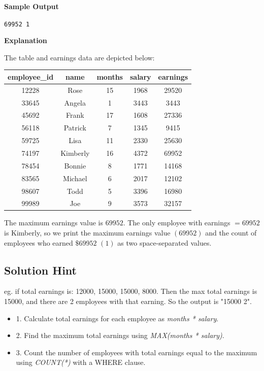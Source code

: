 \documentclass[12pt,a4paper]{article}
\renewcommand{\arraystretch}{1.5} %
\begin{document}
\textbf{Sample Output}
\begin{center}
\texttt{69952 1}
\end{center}

\textbf{Explanation}

The table and earnings data are depicted below:

\begin{table}[H]
\centering
\renewcommand{\arraystretch}{1.25}
\begin{tabular}{|c|c|c|c|c|}
\hline
\textbf{employee\_id} & \textbf{name} & \textbf{months} & \textbf{salary} & \textbf{earnings} \\ \hline
12228 & Rose     & 15 & 1968 & 29520 \\ \hline
33645 & Angela   & 1  & 3443 & 3443  \\ \hline
45692 & Frank    & 17 & 1608 & 27336 \\ \hline
56118 & Patrick  & 7  & 1345 & 9415  \\ \hline
59725 & Lisa     & 11 & 2330 & 25630 \\ \hline
74197 & Kimberly & 16 & 4372 & 69952 \\ \hline
78454 & Bonnie   & 8  & 1771 & 14168 \\ \hline
83565 & Michael  & 6  & 2017 & 12102 \\ \hline
98607 & Todd     & 5  & 3396 & 16980 \\ \hline
99989 & Joe      & 9  & 3573 & 32157 \\ \hline
\end{tabular}
\end{table}
The maximum earnings value is \(69952\). The only employee with earnings \(= 69952\) is Kimberly, so we print the maximum earnings value \((69952)\) and the count of employees who earned \(\$69952\) \((1)\) as two space-separated values.
\subsection*{Solution Hint}
eg. if total earnings is: 12000, 15000, 15000, 8000.
Then the max total earnings is 15000, and there are 2 employees with that earning. So the output is "15000 2".
\begin{itemize}
    \item 1. Calculate total earnings for each employee as \textit{months * salary}.
    \item 2. Find the maximum total earnings using \textit{MAX(months * salary)}.
    \item 3. Count the number of employees with total earnings equal to the maximum using \textit{COUNT(*)} with a WHERE clause.
\end{itemize}
\end{document}
